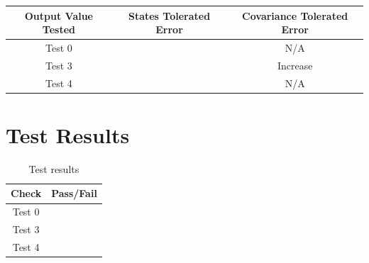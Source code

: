 \begin{table}[ht]
\centering
\begin{tabular}{c|cc}
\hline
\hline
\textbf{Output Value Tested}     & \textbf{States Tolerated Error} & \textbf{Covariance Tolerated Error} \\ \hline
Test 0	        &         		 &  N/A                   \\
Test 3	     &      			 &  Increase                    \\
Test 4	 &      			 &  N/A            		     \\\hline
\end{tabular}
\end{table}

\section{Test Results}

\begin{table}[H]
	\caption{Test results}
	\label{tab:results}
	\centering \fontsize{10}{10}\selectfont
	\begin{tabular}{c | c}
		\hline\hline
		\textbf{Check} 			&\textbf{Pass/Fail} \\
		\hline
	   Test 0	   			&  \\
	   Test 3	   			&  \\
	   Test 4	   			&  \\
	   \hline\hline
	\end{tabular}
\end{table}
